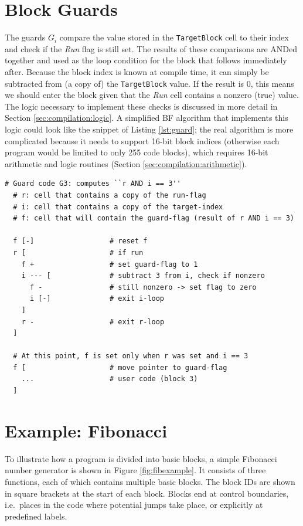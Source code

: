 \section{Block Guards}
\label{sec:compilation:blockguards}
The guards $G_i$ compare the value stored in the \texttt{TargetBlock} cell to their index and check if the \emph{Run} flag is still set. The results of these comparisons are ANDed together and used as the loop condition for the block that follows immediately after. Because the block index is known at compile time, it can simply be subtracted from (a copy of) the \texttt{TargetBlock} value. If the result is 0, this means we should enter the block given that the \emph{Run} cell contains a nonzero (true) value. The logic necessary to implement these checks is discussed in more detail in Section \ref{sec:compilation:logic}. A simplified BF algorithm that implements this logic could look like the snippet of Listing \ref{lst:guard}; the real algorithm is more complicated because it needs to support 16-bit block indices (otherwise each program would be limited to only 255 code blocks), which requires 16-bit arithmetic and logic routines (Section \ref{sec:compilation:arithmetic}).

\begin{lstfloat}[H]
\begin{lstlisting}[style=brainfuck]
  # Guard code G3: computes ``r AND i == 3''
  # r: cell that contains a copy of the run-flag
  # i: cell that contains a copy of the target-index
  # f: cell that will contain the guard-flag (result of r AND i == 3)

  f [-]                  # reset f
  r [                    # if run
    f +                  # set guard-flag to 1
    i --- [              # subtract 3 from i, check if nonzero
      f -                # still nonzero -> set flag to zero
      i [-]              # exit i-loop
    ]
    r -                  # exit r-loop
  ]

  # At this point, f is set only when r was set and i == 3  
  f [                    # move pointer to guard-flag
    ...                  # user code (block 3)
  ]

\end{lstlisting}
\caption{Simplified guard code for block 3 ($G_3$). The contents of block 3 will be executed only if \texttt{f} is nonzero.}
\label{lst:guard}
\end{lstfloat}




\section{Example: Fibonacci}
\label{sec:compilation:fibonacci}
To illustrate how a program is divided into basic blocks, a simple Fibonacci number generator is shown in Figure \ref{fig:fibexample}. It consists of three functions, each of which contains multiple basic blocks. The block IDs are shown in square brackets at the start of each block. Blocks end at control boundaries, i.e.~places in the code where potential jumps take place, or explicitly at predefined labels.


